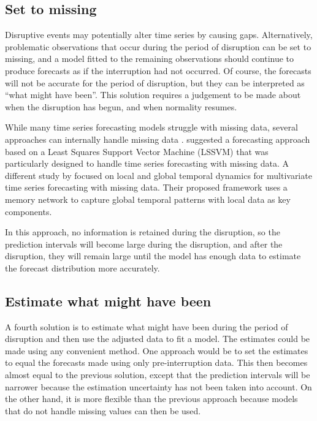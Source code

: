 \documentclass[
  11pt,
  a4paper,
]{article}
\begin{document}
\subsection{Set to missing}\label{set-to-missing}

Disruptive events may potentially alter time series by causing gaps.
Alternatively, problematic observations that occur during the period of
disruption can be set to missing, and a model fitted to the remaining
observations should continue to produce forecasts as if the interruption
had not occurred. Of course, the forecasts will not be accurate for the
period of disruption, but they can be interpreted as ``what might have
been''. This solution requires a judgement to be made about when the
disruption has begun, and when normality resumes.

While many time series forecasting models struggle with missing data,
several approaches can internally handle missing data
\autocite{twala2008good}. \textcite{7157837} suggested a forecasting
approach based on a Least Squares Support Vector Machine (LSSVM) that
was particularly designed to handle time series forecasting with missing
data. A different study by \textcite{tang2020joint} focused on local and
global temporal dynamics for multivariate time series forecasting with
missing data. Their proposed framework uses a memory network to capture
global temporal patterns with local data as key components.

In this approach, no information is retained during the disruption, so
the prediction intervals will become large during the disruption, and
after the disruption, they will remain large until the model has enough
data to estimate the forecast distribution more accurately.

\subsection{Estimate what might have
been}\label{estimate-what-might-have-been}

A fourth solution is to estimate what might have been during the period
of disruption and then use the adjusted data to fit a model. The
estimates could be made using any convenient method. One approach would
be to set the estimates to equal the forecasts made using only
pre-interruption data. This then becomes almost equal to the previous
solution, except that the prediction intervals will be narrower because
the estimation uncertainty has not been taken into account. On the other
hand, it is more flexible than the previous approach because models that
do not handle missing values can then be used.
\end{document}

